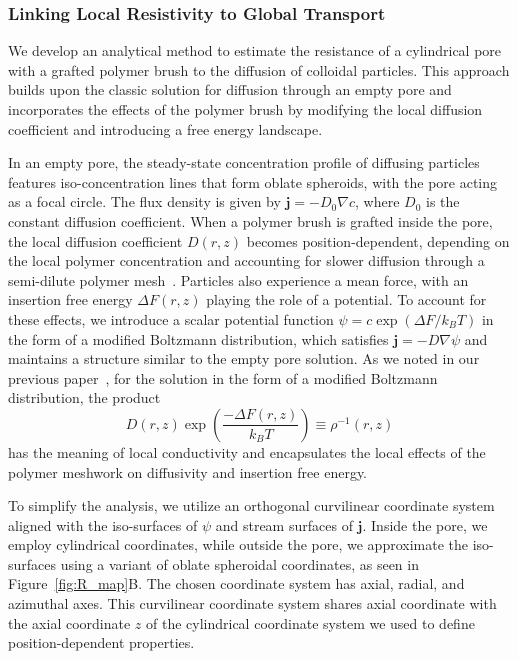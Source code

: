 \documentclass[12pt, a4paper]{article}
\begin{document}
\subsubsection{Linking Local Resistivity to Global Transport}

We develop an analytical method to estimate the resistance of a cylindrical pore with a grafted polymer brush to the diffusion of colloidal particles. 
This approach builds upon the classic solution for diffusion through an empty pore and incorporates the effects of the polymer brush by modifying the local diffusion coefficient and introducing a free energy landscape.

In an empty pore, the steady-state concentration profile of diffusing particles features iso-concentration lines that form oblate spheroids, with the pore acting as a focal circle.
The flux density is given by $\mathbf{j} = -D_0 \nabla c$, where $D_0$ is the constant diffusion coefficient.
When a polymer brush is grafted inside the pore, the local diffusion coefficient $D(r,z)$ becomes position-dependent, depending on the local polymer concentration and accounting for slower diffusion through a semi-dilute polymer mesh~\cite{Cai2011}.
Particles also experience a mean force, with an insertion free energy $\Delta F(r,z)$ playing the role of a potential. To account for these effects, we introduce a scalar potential function $\psi = c\exp(\Delta F / k_B T)$ in the form of a modified Boltzmann distribution, which satisfies $\mathbf{j} = -D \nabla \psi$ and maintains a structure similar to the empty pore solution.
As we noted in our previous paper~\cite{Laktionov2023}, for the solution in the form of a modified Boltzmann distribution, the product
\begin{equation}
    D(r,z) \exp\left( \frac{-\Delta F(r,z)}{k_B T} \right) \equiv \rho^{-1}(r,z)
    \label{eq:local_conuctivity}
\end{equation}
has the meaning of local conductivity and encapsulates the local effects of the polymer meshwork on diffusivity and insertion free energy.

To simplify the analysis, we utilize an orthogonal curvilinear coordinate system aligned with the iso-surfaces of $\psi$ and stream surfaces of $\bm{j}$.
Inside the pore, we employ cylindrical coordinates, while outside the pore, we approximate the iso-surfaces using a variant of oblate spheroidal coordinates, as seen in Figure~\ref{fig:R_map}B. The chosen coordinate system has axial, radial, and azimuthal axes.
This curvilinear coordinate system shares axial coordinate with the axial coordinate $z$ of the cylindrical coordinate system we used to define position-dependent properties.
\end{document}
